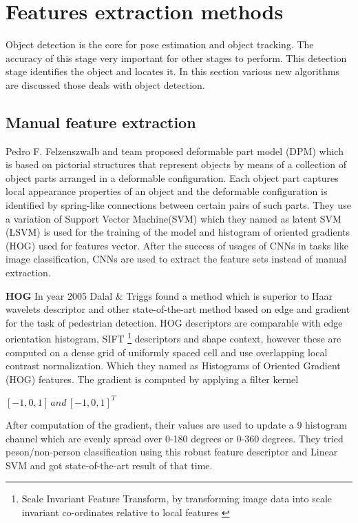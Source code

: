 \section{Features extraction methods}
Object detection \cite{felzenszwalb2009object, walk2010new, liu2016ssd, szegedy2014scalable, dollar2009pedestrian, dollar2011pedestrian} is the core for pose estimation and object tracking. The accuracy of this stage very important for other stages to perform. This detection stage identifies the object and locates it. In this section various new algorithms are discussed those deals with object detection.
\subsection{Manual feature extraction}
Pedro F. Felzenszwalb and team proposed deformable part model (DPM) \cite{felzenszwalb2009object} which is based on pictorial structures that represent objects by means of a collection of object parts arranged in a deformable configuration. Each object part captures local appearance properties of
an object and the deformable configuration is identified by spring-like connections between certain pairs of such parts. They use a variation of Support Vector Machine(SVM) which they named as latent SVM (LSVM) is used for the training of the model and  histogram of oriented gradients (HOG) used for features vector. After the success of usages of CNNs in tasks like image classification, CNNs are used to extract the feature sets instead of manual extraction.

\newpara \textbf{HOG }
In year 2005 Dalal \& Triggs found a method which is superior to Haar wavelets descriptor and other state-of-the-art method based on edge and gradient for the task of pedestrian detection. HOG descriptors are comparable with edge orientation histogram, SIFT \footnote{Scale Invariant Feature Transform, by transforming image data into scale invariant co-ordinates relative to local features \cite{lowe2004distinctive}} descriptors and shape context, however these are computed on a dense grid of uniformly spaced cell and use overlapping local contrast normalization. Which they named as Histograms of Oriented Gradient (HOG) features\cite{dalal2005histograms}. The gradient is computed by applying a filter kernel \\
\begin{center}
$[-1,0,1] \, and \, [-1,0,1] ^{T}$
\end{center}

\newpara After computation of the gradient, their values are used to update a 9 histogram channel which are evenly spread over 0-180 degrees or 0-360 degrees. They tried peson/non-person classification using this robust feature descriptor and Linear SVM and got state-of-the-art result of that time.

